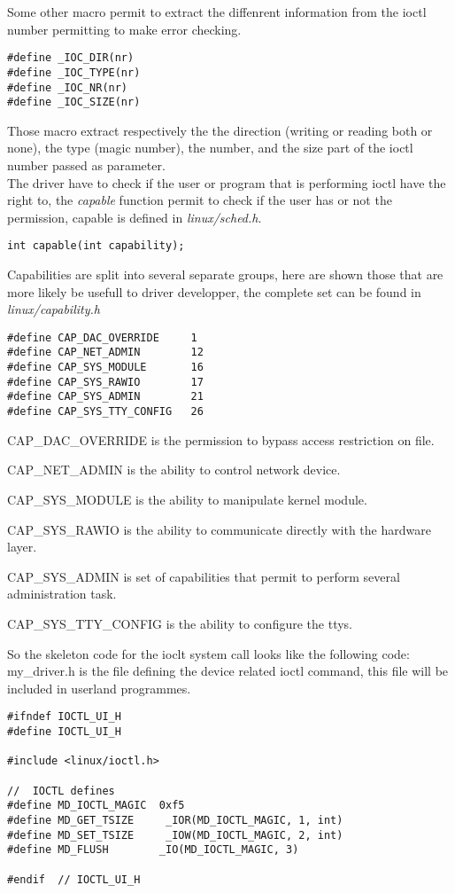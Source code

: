\documentclass[11pt]{report}
\begin{document}
 Some other macro permit to extract the diffenrent information from the ioctl
 number permitting to make error checking.
\begin{lstlisting}
#define _IOC_DIR(nr)	
#define _IOC_TYPE(nr)	
#define _IOC_NR(nr)		
#define _IOC_SIZE(nr)	
\end{lstlisting}
Those macro extract respectively the the direction (writing or reading both or
none), the type (magic number), the number, and the size part of the ioctl
number passed as parameter.\\
The driver have to check if the user or program that is performing ioctl have
the right to, the  {\it capable} function permit to check if the user has or
not the permission, capable is defined in  {\it linux/sched.h}.
\begin{lstlisting}
int capable(int capability);
\end{lstlisting}
Capabilities are split into several separate groups, here are shown those that
are more likely be usefull to driver developper, the complete set can be found
in  {\it linux/capability.h}
\begin{lstlisting}
#define CAP_DAC_OVERRIDE     1
#define CAP_NET_ADMIN        12
#define CAP_SYS_MODULE       16
#define CAP_SYS_RAWIO        17
#define CAP_SYS_ADMIN        21
#define CAP_SYS_TTY_CONFIG   26
\end{lstlisting}
\begin{description}
    \item{CAP\_DAC\_OVERRIDE} is the permission to bypass access restriction on
    file.
    \item{CAP\_NET\_ADMIN} is the ability to control network device.
    \item{CAP\_SYS\_MODULE} is the ability to manipulate kernel module.
    \item{CAP\_SYS\_RAWIO} is the ability to communicate directly with the
    hardware layer.
    \item{CAP\_SYS\_ADMIN} is set of capabilities that permit to perform several
    administration task.
    \item{CAP\_SYS\_TTY\_CONFIG} is the ability to configure the ttys.
\end{description}

So the skeleton code for the ioclt system call looks like the following code:\\
my\_driver.h is the file defining the device related ioctl command, this file
will be included in userland programmes.
\begin{lstlisting}
#ifndef IOCTL_UI_H
#define IOCTL_UI_H

#include <linux/ioctl.h>

//  IOCTL defines
#define MD_IOCTL_MAGIC  0xf5
#define MD_GET_TSIZE     _IOR(MD_IOCTL_MAGIC, 1, int)
#define MD_SET_TSIZE     _IOW(MD_IOCTL_MAGIC, 2, int)
#define MD_FLUSH        _IO(MD_IOCTL_MAGIC, 3)

#endif  // IOCTL_UI_H
\end{lstlisting}
\end{document}
